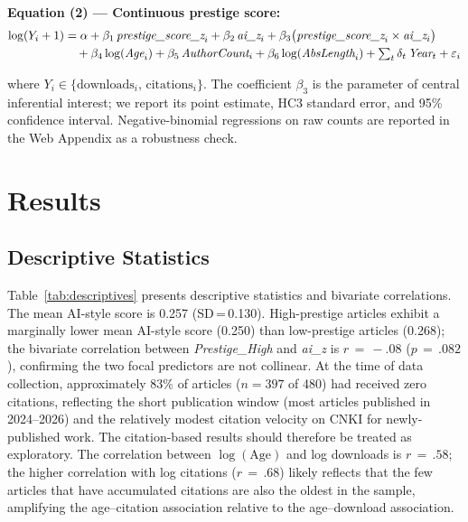 \documentclass[12pt,a4paper]{article}
\begin{document}
\noindent\textbf{Equation (2) --- Continuous prestige score:}
\begin{align}
\log(Y_i+1) &= \alpha
  + \beta_1\,\textit{prestige\_score\_z}_i
  + \beta_2\,\textit{ai\_z}_i
  + \beta_3\bigl(\textit{prestige\_score\_z}_i\times\textit{ai\_z}_i\bigr)
  \notag\\
  &\quad
  + \beta_4\log(\textit{Age}_i)
  + \beta_5\,\textit{AuthorCount}_i
  + \beta_6\log(\textit{AbsLength}_i)
  + \textstyle\sum_{t}\delta_t\,\textit{Year}_t
  + \varepsilon_i
\label{eq:score}
\end{align}

\noindent
where $Y_i\in\{\text{downloads}_i,\,\text{citations}_i\}$.
The coefficient $\beta_3$ is the parameter of central inferential
interest; we report its point estimate, HC3 standard error, and 95\%
confidence interval.
Negative-binomial regressions on raw counts are reported in the
Web Appendix as a robustness check.

\section{Results}
\label{sec:results}

\subsection{Descriptive Statistics}

Table~\ref{tab:descriptives} presents descriptive statistics and
bivariate correlations.
The mean AI-style score is 0.257 (SD\,=\,0.130).
High-prestige articles exhibit a marginally lower mean AI-style score
(0.250) than low-prestige articles (0.268); the bivariate correlation
between \textit{Prestige\_High} and \textit{ai\_z} is $r\,=\,{-}.08$
($p\,=\,.082$), confirming the two focal predictors are not collinear.
At the time of data collection, approximately 83\% of articles ($n = 397$
of 480) had received zero citations, reflecting the short publication window
(most articles published in 2024--2026) and the relatively modest
citation velocity on CNKI for newly-published work.
The citation-based results should therefore be treated as exploratory.
The correlation between $\log(\text{Age})$ and log downloads is
$r\,=\,.58$; the higher correlation with log citations ($r\,=\,.68$)
likely reflects that the few articles that have accumulated citations
are also the oldest in the sample, amplifying the age--citation
association relative to the age--download association.
\end{document}
